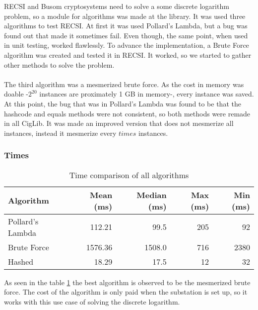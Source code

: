 
	RECSI and Busom cryptosystems need to solve a some discrete logarithm
	problem, so a module for algorithms was made at the library.
	It was used three algorithms to test RECSI. At first it was used Pollard's
	Lambda, but a bug was found out that made it sometimes fail. Even though, 
	 the same point, when used in unit testing, worked flawlessly. To advance the
	implementation, a Brute Force algorithm was created and tested it in RECSI.
	It worked, so we started to gather other methods to solve the problem.\\
	\\
	The third algorithm was a mesmerized brute force. As the cost in memory was
	doable -$2^{20}$ instances are proximately 1 GB in memory-, every instance was saved. At this point, the bug that was in Pollard's
	Lambda was found to be that the hashcode and equals methods were not consistent, so both methods were remade in all CigLib. It was made an improved version that does not mesmerize all instances, instead it mesmerize every $times$ instances.
	\subsubsection{Times}
	
	
	\begin{table}[h]
		\centering
	\begin{tabular}{l|rrrr}
		Algorithm &  Mean (ms) & Median (ms) & Max (ms) &Min (ms)\\ 
		\hline 
		Pollard's Lambda&112.21&99.5&205&92  \\
		Brute Force &1576.36 &1508.0 &716 &2380\\
		Hashed &18.29 &17.5 &12 &32
		

	\end{tabular}
	\caption{Time comparison of all algorithms}
	\label{wrap:time}
	\end{table}

	As seen in the table \ref{wrap:time}
	the best algorithm is observed to be the mesmerized brute force.
	The cost of the algorithm is only paid when the substation is set up, so it works with this use case of solving the discrete logarithm.
